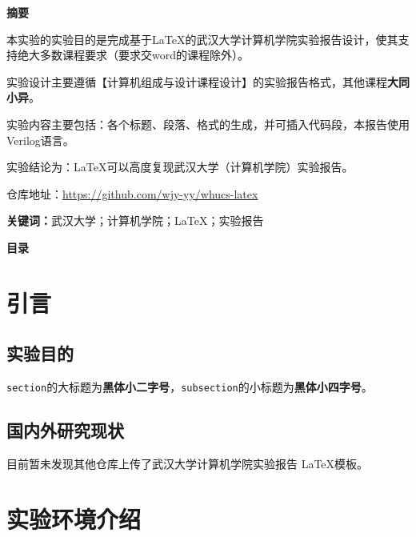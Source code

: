 \documentclass[UTF8,a4paper,autofakebold,15pt]{ctexart}
\begin{document}
\newpage

	
\begin{center}
	{\bf 摘\quad 要}
\end{center}


	本实验的实验目的是完成基于\LaTeX 的武汉大学计算机学院实验报告设计，使其支持绝大多数课程要求（要求交word的课程除外）。

	实验设计主要遵循【计算机组成与设计课程设计】\cite{ref1}的实验报告格式，其他课程{\bf 大同小异}。

	实验内容主要包括：各个标题、段落、格式的生成，并可插入代码段，本报告使用Verilog语言。

	实验结论为：\LaTeX 可以高度复现武汉大学（计算机学院）实验报告。

	仓库地址：\href{https://github.com/wjy-yy/whucs-latex}{https://github.com/wjy-yy/whucs-latex}

	{\bf 关键词：}武汉大学；计算机学院；\LaTeX；实验报告
	
\newpage

	
	\begin{center}
		{\bf 目\quad 录}
	\end{center}
	
	
	\renewcommand{\contentsname}{}
	
	\tableofcontents
	
\newpage


\section{引言}

\subsection{实验目的}

	{\tt section}的大标题为{\bf 黑体小二字号}，{\tt subsection}的小标题为{\bf 黑体小四字号}。

\subsection{国内外研究现状}

	目前暂未发现其他仓库上传了武汉大学计算机学院实验报告 \LaTeX 模板。

\newpage

\section{实验环境介绍}
\end{document}
